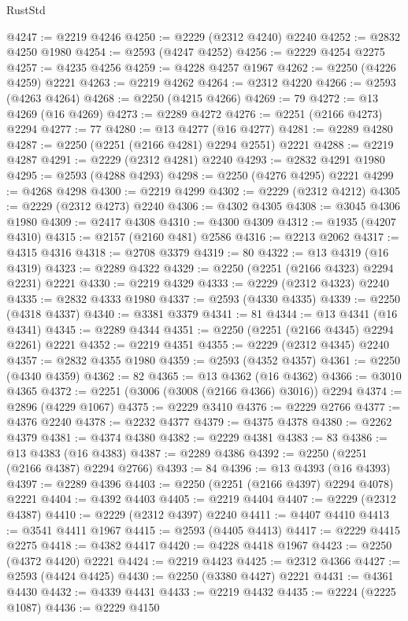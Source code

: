 \begin{lexlean}{RustStd}
\begin{coremodule}
{\begin{coremodule}
{{{{{{{{{{{{{{{{{{{{{{{{{{{{{{{{{{{{{{{{{{{{{{{{{{{{{@4247 := @2219 @4246
@4250 := @2229 (@2312 @4240) @2240
@4252 := @2832 @4250 @1980
@4254 := @2593 (@4247 @4252)
@4256 := @2229 @4254 @2275
@4257 := @4235 @4256
@4259 := @4228 @4257 @1967
@4262 := @2250 (@4226 @4259) @2221
@4263 := @2219 @4262
@4264 := @2312 @4220
@4266 := @2593 (@4263 @4264)
@4268 := @2250 (@4215 @4266)
@4269 := 79
@4272 := @13 @4269 (@16 @4269)
@4273 := @2289 @4272
@4276 := @2251 (@2166 @4273) @2294
@4277 := 77
@4280 := @13 @4277 (@16 @4277)
@4281 := @2289 @4280
@4287 := @2250 (@2251 (@2166 @4281) @2294 @2551) @2221
@4288 := @2219 @4287
@4291 := @2229 (@2312 @4281) @2240
@4293 := @2832 @4291 @1980
@4295 := @2593 (@4288 @4293)
@4298 := @2250 (@4276 @4295) @2221
@4299 := @4268 @4298
@4300 := @2219 @4299
@4302 := @2229 (@2312 @4212)
@4305 := @2229 (@2312 @4273) @2240
@4306 := @4302 @4305
@4308 := @3045 @4306 @1980
@4309 := @2417 @4308
@4310 := @4300 @4309
@4312 := @1935 (@4207 @4310)
@4315 := @2157 (@2160 @481) @2586
@4316 := @2213 @2062
@4317 := @4315 @4316
@4318 := @2708 @3379
@4319 := 80
@4322 := @13 @4319 (@16 @4319)
@4323 := @2289 @4322
@4329 := @2250 (@2251 (@2166 @4323) @2294 @2231) @2221
@4330 := @2219 @4329
@4333 := @2229 (@2312 @4323) @2240
@4335 := @2832 @4333 @1980
@4337 := @2593 (@4330 @4335)
@4339 := @2250 (@4318 @4337)
@4340 := @3381 @3379
@4341 := 81
@4344 := @13 @4341 (@16 @4341)
@4345 := @2289 @4344
@4351 := @2250 (@2251 (@2166 @4345) @2294 @2261) @2221
@4352 := @2219 @4351
@4355 := @2229 (@2312 @4345) @2240
@4357 := @2832 @4355 @1980
@4359 := @2593 (@4352 @4357)
@4361 := @2250 (@4340 @4359)
@4362 := 82
@4365 := @13 @4362 (@16 @4362)
@4366 := @3010 @4365
@4372 := @2251 (@3006 (@3008 (@2166 @4366) @3016)) @2294
@4374 := @2896 (@4229 @1067)
@4375 := @2229 @3410
@4376 := @2229 @2766
@4377 := @4376 @2240
@4378 := @2232 @4377
@4379 := @4375 @4378
@4380 := @2262 @4379
@4381 := @4374 @4380
@4382 := @2229 @4381
@4383 := 83
@4386 := @13 @4383 (@16 @4383)
@4387 := @2289 @4386
@4392 := @2250 (@2251 (@2166 @4387) @2294 @2766)
@4393 := 84
@4396 := @13 @4393 (@16 @4393)
@4397 := @2289 @4396
@4403 := @2250 (@2251 (@2166 @4397) @2294 @4078) @2221
@4404 := @4392 @4403
@4405 := @2219 @4404
@4407 := @2229 (@2312 @4387)
@4410 := @2229 (@2312 @4397) @2240
@4411 := @4407 @4410
@4413 := @3541 @4411 @1967
@4415 := @2593 (@4405 @4413)
@4417 := @2229 @4415 @2275
@4418 := @4382 @4417
@4420 := @4228 @4418 @1967
@4423 := @2250 (@4372 @4420) @2221
@4424 := @2219 @4423
@4425 := @2312 @4366
@4427 := @2593 (@4424 @4425)
@4430 := @2250 (@3380 @4427) @2221
@4431 := @4361 @4430
@4432 := @4339 @4431
@4433 := @2219 @4432
@4435 := @2224 (@2225 @1087)
@4436 := @2229 @4150
}}}}}}}}}}}}}}}}}}}}}}}}}}}}}}}}}}}}}}}}}}}}}}}}}}}}}
\end{coremodule}}
\end{coremodule}
\end{lexlean}
